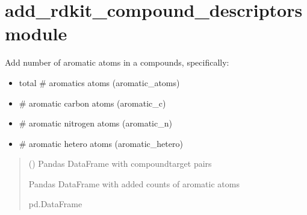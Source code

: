 \documentclass[letterpaper,10pt,english]{sphinxmanual}
\begin{document}
\sphinxstepscope


\section{add\_rdkit\_compound\_descriptors module}
\label{\detokenize{add_rdkit_compound_descriptors:module-add_rdkit_compound_descriptors}}\label{\detokenize{add_rdkit_compound_descriptors:add-rdkit-compound-descriptors-module}}\label{\detokenize{add_rdkit_compound_descriptors::doc}}

\begin{fulllineitems}
\label{\detokenize{add_rdkit_compound_descriptors:add_rdkit_compound_descriptors.add_aromaticity_descriptors}}
\pysigstartsignatures
{}
\pysigstopsignatures
\sphinxAtStartPar
Add number of aromatic atoms in a compounds, specifically:
\begin{itemize}
\item {} 
\sphinxAtStartPar
total \# aromatics atoms (aromatic\_atoms)

\item {} 
\sphinxAtStartPar
\# aromatic carbon atoms (aromatic\_c)

\item {} 
\sphinxAtStartPar
\# aromatic nitrogen atoms (aromatic\_n)

\item {} 
\sphinxAtStartPar
\# aromatic hetero atoms (aromatic\_hetero)

\end{itemize}
\begin{quote}\begin{description}
\sphinxAtStartPar
{} () \textendash{} Pandas DataFrame with compound\sphinxhyphen{}target pairs

\sphinxAtStartPar
Pandas DataFrame with added counts of aromatic atoms

\sphinxAtStartPar
pd.DataFrame

\end{description}\end{quote}

\end{fulllineitems}
\end{document}
